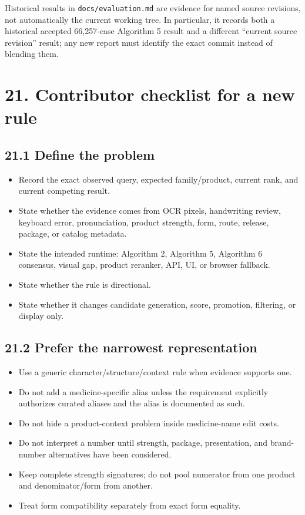 Historical results in \texttt{docs/evaluation.md} are evidence for named source revisions, not automatically the current working tree. In particular, it records both a historical accepted 66,257-case Algorithm 5 result and a different ``current source revision'' result; any new report must identify the exact commit instead of blending them.

\section{21. Contributor checklist for a new rule}\label{21-contributor-checklist-for-a-new-rule}

\subsection{21.1 Define the problem}\label{211-define-the-problem}

\begin{itemize}
\tightlist
\item[$\square$]
  Record the exact observed query, expected family/product, current rank, and current competing result.
\item[$\square$]
  State whether the evidence comes from OCR pixels, handwriting review, keyboard error, pronunciation, product strength, form, route, release, package, or catalog metadata.
\item[$\square$]
  State the intended runtime: Algorithm 2, Algorithm 5, Algorithm 6 consensus, visual gap, product reranker, API, UI, or browser fallback.
\item[$\square$]
  State whether the rule is directional.
\item[$\square$]
  State whether it changes candidate generation, score, promotion, filtering, or display only.
\end{itemize}

\subsection{21.2 Prefer the narrowest representation}\label{212-prefer-the-narrowest-representation}

\begin{itemize}
\tightlist
\item[$\square$]
  Use a generic character/structure/context rule when evidence supports one.
\item[$\square$]
  Do not add a medicine-specific alias unless the requirement explicitly authorizes curated aliases and the alias is documented as such.
\item[$\square$]
  Do not hide a product-context problem inside medicine-name edit costs.
\item[$\square$]
  Do not interpret a number until strength, package, presentation, and brand-number alternatives have been considered.
\item[$\square$]
  Keep complete strength signatures; do not pool numerator from one product and denominator/form from another.
\item[$\square$]
  Treat form compatibility separately from exact form equality.
\end{itemize}

